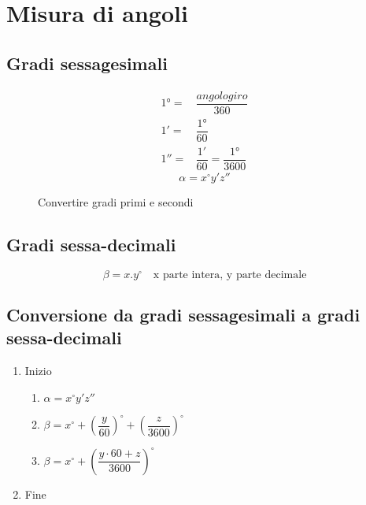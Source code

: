 \chapter{Misura di angoli}
\section{Gradi sessagesimali}
\begin{align*}
\ang{1}=&\dfrac{angolo giro}{360}\\
\ang{;1;}=&\dfrac{\ang{1}}{60}\\
\ang{;;1}=&\dfrac{\ang{;1;}}{60}=\dfrac{\ang{1}}{3600}
\end{align*}
\begin{equation*}
\alpha=x^\circ y'z''
\end{equation*}
\begin{figure} %
	\centering
	
	\caption{Convertire gradi primi e secondi}\label{fig:Convertiregradiprimisecondi}
\end{figure}
\section{Gradi sessa-decimali}
\begin{equation*}
\beta=x.y^\circ\quad\text{x parte intera, y parte decimale}
\end{equation*}
\section{Conversione da gradi sessagesimali a gradi sessa-decimali}
\begin{enumerate}
	\item Inizio
	\begin{enumerate}
		\item $\alpha=x^\circ y'z''$
		\item $\beta=x^\circ+\left(\dfrac{y}{60}\right)^\circ+\left(\dfrac{z}{3600}\right)^\circ$\\
		\item $\beta=x^\circ+\left(\dfrac{y\cdot 60 +z}{3600}\right)^\circ$
	\end{enumerate}
\item Fine
\end{enumerate}
